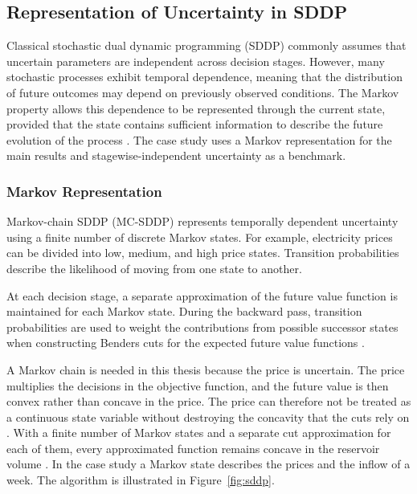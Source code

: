 \subsection{Representation of Uncertainty in SDDP}
\label{subsec:representation_of_uncertainty}

Classical stochastic dual dynamic programming (SDDP)
commonly assumes that uncertain parameters are independent
across decision stages. However, many stochastic processes
exhibit temporal dependence, meaning that the distribution
of future outcomes may depend on previously observed
conditions. The Markov property allows this dependence
to be represented through the current state, provided
that the state contains sufficient information to
describe the future evolution of the process
\parencite{lohndorfShapiro2019}. %
The case study uses a Markov representation for the main results and stagewise-independent uncertainty as a benchmark.

\subsubsection{Markov Representation}

Markov-chain SDDP (MC-SDDP) represents temporally
dependent uncertainty using a finite number of discrete
Markov states. For example, electricity prices can be
divided into low, medium, and high price states.
Transition probabilities describe the likelihood of
moving from one state to another.

At each decision stage, a separate approximation of
the future value function is maintained for each Markov
state. During the backward pass, transition probabilities
are used to weight the contributions from possible
successor states when constructing Benders cuts for
the expected future value functions
\parencite[pp.~495--497]{fullnerRebennack2025}.

A Markov chain is needed in this thesis because the price is uncertain. The price multiplies the decisions in the objective function, and the future value is then convex rather than concave in the price. The price can therefore not be treated as a continuous state variable without destroying the concavity that the cuts rely on \parencites[p.~31]{helseth2020scheduling}[p.~495]{fullnerRebennack2025}. With a finite number of Markov states and a separate cut approximation for each of them, every approximated function remains concave in the reservoir volume \parencite[p.~496]{fullnerRebennack2025}. In the case study a Markov state describes the prices and the inflow of a week. %
The algorithm is illustrated in Figure~\ref{fig:sddp}.

